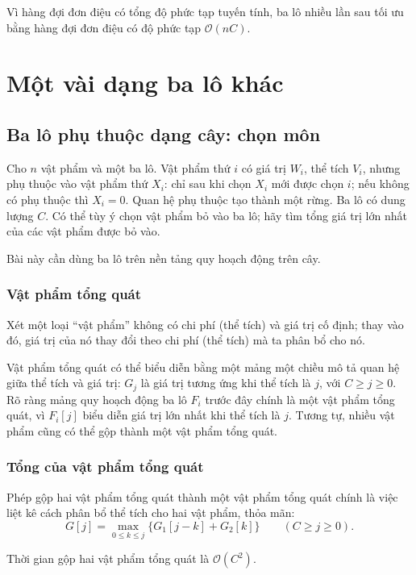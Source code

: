 \documentclass[11pt]{article}
\newcommand{\Oh}{\mathcal{O}}
\begin{document}
Vì hàng đợi đơn điệu có tổng độ phức tạp tuyến tính, ba lô nhiều lần sau tối
ưu bằng hàng đợi đơn điệu có độ phức tạp \(\Oh(nC)\).

\section{Một vài dạng ba lô khác}

\subsection{Ba lô phụ thuộc dạng cây: chọn môn}

Cho \(n\) vật phẩm và một ba lô. Vật phẩm thứ \(i\) có giá trị \(W_i\), thể
tích \(V_i\), nhưng phụ thuộc vào vật phẩm thứ \(X_i\): chỉ sau khi chọn
\(X_i\) mới được chọn \(i\); nếu không có phụ thuộc thì \(X_i=0\). Quan hệ phụ
thuộc tạo thành một rừng. Ba lô có dung lượng \(C\). Có thể tùy ý chọn vật
phẩm bỏ vào ba lô; hãy tìm tổng giá trị lớn nhất của các vật phẩm được bỏ vào.

Bài này cần dùng ba lô trên nền tảng quy hoạch động trên cây.

\subsubsection*{Vật phẩm tổng quát}

Xét một loại ``vật phẩm'' không có chi phí (thể tích) và giá trị cố định; thay
vào đó, giá trị của nó thay đổi theo chi phí (thể tích) mà ta phân bổ cho nó.

Vật phẩm tổng quát có thể biểu diễn bằng một mảng một chiều mô tả quan hệ giữa
thể tích và giá trị: \(G_j\) là giá trị tương ứng khi thể tích là \(j\), với
\(C\ge j\ge 0\). Rõ ràng mảng quy hoạch động ba lô \(F_i\) trước đây chính là
một vật phẩm tổng quát, vì \(F_i[j]\) biểu diễn giá trị lớn nhất khi thể tích
là \(j\). Tương tự, nhiều vật phẩm cũng có thể gộp thành một vật phẩm tổng
quát.

\subsubsection*{Tổng của vật phẩm tổng quát}

Phép gộp hai vật phẩm tổng quát thành một vật phẩm tổng quát chính là việc liệt
kê cách phân bổ thể tích cho hai vật phẩm, thỏa mãn:
\[
  G[j]=\max_{0\le k\le j}\{G_1[j-k]+G_2[k]\}
  \qquad (C\ge j\ge 0).
\]

Thời gian gộp hai vật phẩm tổng quát là \(\Oh(C^2)\).
\end{document}
